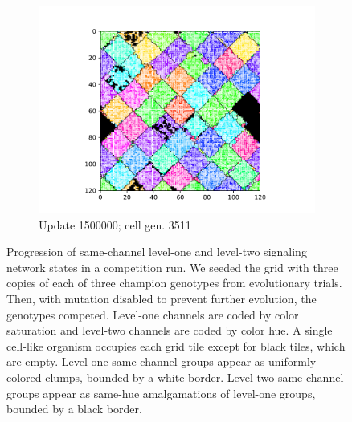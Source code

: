 \begin{figure}
\begin{center}
\begin{subfigure}[b]{0.33\columnwidth}
  \includegraphics[width=\columnwidth,trim={2.5cm 0.5cm 2.5cm 1cm},clip]{img/ChannelMap_1030_update1500000}
  \vspace{-5ex}
  \caption{Update 1500000; cell gen. 3511}
  \label{fig:ChannelMap_1030_update1500000}
\end{subfigure}
\caption{
Progression of same-channel level-one and level-two signaling network states in a competition run.
We seeded the grid with three copies of each of three champion genotypes from evolutionary trials.
Then, with mutation disabled to prevent further evolution, the genotypes competed.
Level-one channels are coded by color saturation and level-two channels are coded by color hue.
A single cell-like organism occupies each grid tile except for black tiles, which are empty.
Level-one same-channel groups appear as uniformly-colored clumps, bounded by a white border.
Level-two same-channel groups appear as same-hue amalgamations of level-one groups, bounded by a black border.
}
\label{fig:eco_progression}
\end{center}
\end{figure}
